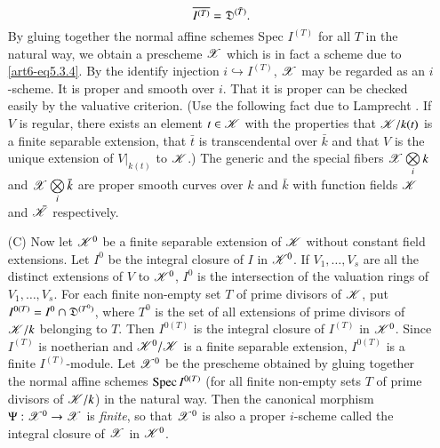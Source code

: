 \begin{itemize}
\begin{equation}
\overline{I^{(T)}} = \mathfrak{D}^{(\bar{T})}. \label{art6-eq5.3.5}
\end{equation}
By gluing together the normal affine schemes Spec $I^{(T)}$ for all $T$ in the natural way, we obtain a prescheme $\mathscr{X}$ which is in fact a scheme due to \eqref{art6-eq5.3.4}. By the identify injection $i \hookrightarrow I^{(T)}$, $\mathscr{X}$ may be regarded as an $i$-scheme. It is proper and smooth over $i$. That it is proper can be checked easily by the valuative criterion. (Use the following fact due to Lamprecht \cite{art6-key11}. If $V$ is regular, there exists an element $t \in \mathscr{K}$ with the properties that $\mathscr{K} / k (t)$ is a finite separable extension, that $\bar{t}$ is transcendental over $\bar{k}$ and that $V$ is the unique extension of $V |_{k(t)}$ to $\mathscr{K}$.) The generic and the special fibers $\mathscr{X} \bigotimes\limits_i k$ and $\mathscr{X} \bigotimes\limits_i \bar{k}$ are proper smooth curves over $k$ and $\bar{k}$ with function fields $\mathscr{K}$ and $\bar{\mathscr{K}}$ respectively.

\item[(C)] Now let $\mathscr{K}^0$ be a finite separable extension of $\mathscr{K}$ without constant field extensions. Let $I^0$ be the integral closure of $I$ in $\mathscr{K}^0$. If $V_1,\ldots, V_s$ are all the distinct extensions of $V$ to $\mathscr{K}^0$, $I^0$ is the intersection of the valuation rings of $V_1, \ldots, V_s$. For each finite non-empty set $T$ of prime divisors of $\mathscr{K}$, put $I^{0(T)} = I^0 \cap \mathfrak{D}^{(T^0)}$, where $T^0$ is the set of all extensions of prime divisors of $\mathscr{K}/k$ belonging to $T$. Then $I^{0(T)}$ is the integral closure of $I^{(T)}$ in $\mathscr{K}^0$. Since $I^{(T)}$ is noetherian and $\mathscr{K}^0/ \mathscr{K}$ is a finite separable extension, $I^{0(T)}$ is a finite $I^{(T)}$-module. Let $\mathscr{X}^0$ be the prescheme obtained by gluing together the normal affine schemes $\operatorname{Spec} I^{0(T)}$ (for all finite non-empty sets $T$ of prime divisors of $\mathscr{K}/k$) in the natural way. Then the canonical morphism $\Psi : \mathscr{X}^0 \to \mathscr{X}$ is \textit{finite}, so that $\mathscr{X}^0$ is also a proper $i$-scheme called the integral closure of $\mathscr{X}$ in $\mathscr{K}^0$. 


\end{itemize}
